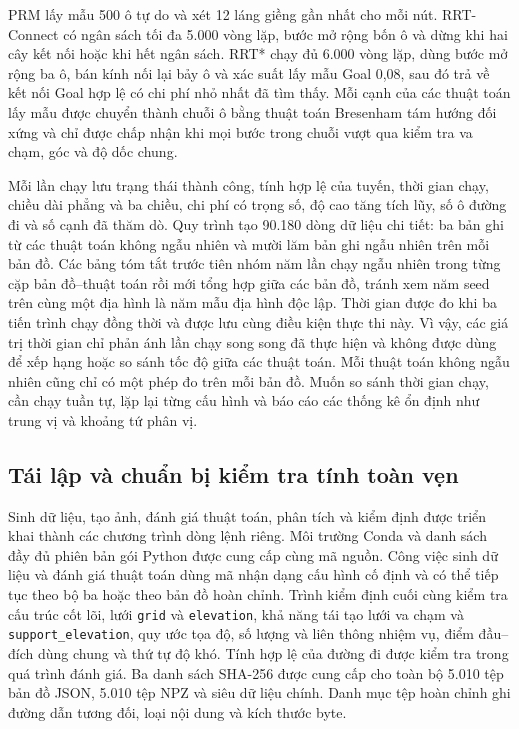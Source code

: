 \documentclass[11pt]{article}
\begin{document}
PRM lấy mẫu 500 ô tự do và xét 12 láng giềng gần nhất cho mỗi nút. RRT-Connect
có ngân sách tối đa 5.000 vòng lặp, bước mở rộng bốn ô và dừng khi hai cây kết
nối hoặc khi hết ngân sách. RRT* chạy đủ 6.000 vòng lặp, dùng bước mở rộng ba ô,
bán kính nối lại bảy ô và xác suất lấy mẫu Goal 0,08, sau đó trả về kết nối Goal
hợp lệ có chi phí nhỏ nhất đã tìm thấy. Mỗi cạnh của các thuật toán lấy mẫu được
chuyển thành chuỗi ô bằng thuật toán Bresenham tám hướng đối xứng và chỉ được
chấp nhận khi mọi bước trong chuỗi vượt
qua kiểm tra va chạm, góc và độ dốc chung.

Mỗi lần chạy lưu trạng thái thành công, tính hợp lệ của tuyến, thời gian chạy, chiều dài
phẳng và ba chiều, chi phí có trọng số, độ cao tăng tích lũy, số ô đường đi và
số cạnh đã thăm dò. Quy trình tạo 90.180 dòng dữ liệu chi tiết: ba bản ghi từ các
thuật toán không ngẫu nhiên và mười lăm bản ghi ngẫu nhiên trên mỗi bản đồ. Các bảng
tóm tắt trước tiên nhóm năm lần chạy ngẫu nhiên trong từng cặp bản đồ--thuật
toán rồi mới tổng hợp giữa các bản đồ, tránh xem năm seed trên cùng một địa hình
là năm mẫu địa hình độc lập. Thời gian được đo khi ba tiến trình chạy đồng thời
và được lưu cùng điều kiện thực thi này. Vì vậy, các giá trị thời gian chỉ phản
ánh lần chạy song song đã thực hiện và không được dùng để xếp hạng hoặc so sánh
tốc độ giữa các thuật toán. Mỗi thuật toán không ngẫu nhiên cũng chỉ có một phép
đo trên mỗi bản đồ. Muốn so sánh thời gian chạy, cần chạy tuần tự, lặp lại từng
cấu hình và báo cáo các thống kê ổn định như trung vị và khoảng tứ phân vị.

\subsection{Tái lập và chuẩn bị kiểm tra tính toàn vẹn}

Sinh dữ liệu, tạo ảnh, đánh giá thuật toán, phân tích và kiểm định được triển khai
thành các chương trình dòng lệnh riêng. Môi trường Conda và danh sách đầy đủ
phiên bản gói Python được cung cấp cùng mã nguồn. Công việc sinh dữ liệu và
đánh giá thuật toán dùng mã nhận dạng cấu hình cố định và có thể tiếp tục theo bộ ba hoặc theo
bản đồ hoàn chỉnh. Trình kiểm định cuối cùng kiểm tra cấu trúc cốt lõi, lưới
\texttt{grid} và \texttt{elevation}, khả năng tái tạo lưới va chạm và
\texttt{support\_elevation}, quy ước tọa độ, số lượng và liên thông nhiệm vụ,
điểm đầu--đích dùng chung và thứ tự độ khó. Tính hợp lệ của đường đi được kiểm
tra trong quá trình đánh giá. Ba danh sách SHA-256 được cung cấp cho toàn bộ
5.010 tệp bản đồ JSON, 5.010 tệp NPZ và siêu dữ liệu chính. Danh mục tệp hoàn chỉnh
ghi đường dẫn tương đối, loại nội dung và kích thước byte.
\end{document}
